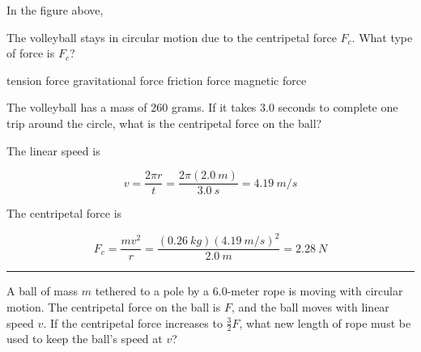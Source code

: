 \documentclass[answers]{exam}
\begin{document}
\begin{questions}
\question \label{2nF3qF}
In the figure above,



\question
The volleyball stays in circular motion due to the centripetal force $F_c$. What type of force is $F_c$?

\begin{randomizechoices}
    \correctchoice tension force
    \choice gravitational force
    \choice friction force
    \choice magnetic force
\end{randomizechoices}

\question \label{oSRba9}
The volleyball has a mass of 260 grams. If it takes 3.0 seconds to complete one trip around the circle, what is the centripetal force on the ball?

\begin{solutionorbox}[4cm]
The linear speed is

\begin{equation*}
    v = \frac{2\pi r}{t} = \frac{2\pi(\SI{2.0}{m})}{\SI{3.0}{s}} = \SI{4.19}{m/s}
\end{equation*}

The centripetal force is

\begin{equation*}
    F_c = \frac{mv^2}{r} = \frac{(\SI{0.26}{kg})\left(\SI{4.19}{m/s}\right)^2}{\SI{2.0}{m}} = \boxed{\SI{2.28}{N}}
\end{equation*}
\end{solutionorbox}

\bigskip

\hrule

\question \label{}
A ball of mass $m$ tethered to a pole by a 6.0-meter rope is moving with circular motion. The centripetal force on the ball is $F$, and the ball moves with linear speed $v$. If the centripetal force increases to $\frac{3}{2}F$, what new length of rope must be used to keep the ball's speed at $v$?


\end{questions}
\end{document}
